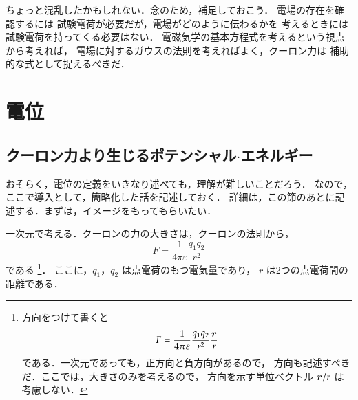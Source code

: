            ちょっと混乱したかもしれない．念のため，補足しておこう．
            電場の存在を確認するには
            試験電荷が必要だが，電場がどのように伝わるかを
            考えるときには試験電荷を持ってくる必要はない．
            電磁気学の基本方程式を考えるという視点から考えれば，
            電場に対するガウスの法則を考えればよく，クーロン力は
            補助的な式として捉えるべきだ．


    \section{電位}
        \subsection{クーロン力より生じるポテンシャル$\cdot$エネルギー}
            おそらく，電位の定義をいきなり述べても，理解が難しいことだろう．
            なので，ここで導入として，簡略化した話を記述しておく．
            詳細は，この節のあとに記述する．まずは，イメージをもってもらいたい．

            一次元で考える．クーロンの力の大きさは，クーロンの法則から，
                \begin{equation*}
                    F=
                    \frac{1}{4 \pi \varepsilon}
                    \frac{q_{1}q_{2}}{{r}^{2}}
                \end{equation*}
            である
                \footnote{
                    方向をつけて書くと
                        \begin{equation*}
                            F=
                            \frac{1}{4 \pi \varepsilon}
                            \frac{q_{1}q_{2}}{{r}^{2}}
                            \frac{\boldsymbol{r}}{r}
                        \end{equation*}
                    である．一次元であっても，正方向と負方向があるので，
                    方向も記述すべきだ．ここでは，大きさのみを考えるので，
                    方向を示す単位ベクトル $\boldsymbol{r}/r$ は考慮しない．
                }．
            ここに，$q_{1}$，$q_{2}$ は点電荷のもつ電気量であり，
            $r$ は2つの点電荷間の距離である．

